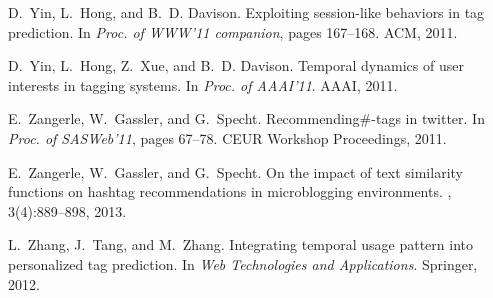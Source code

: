 \documentclass{sig-alternate-05-2015}
\begin{document}
\begin{thebibliography}{10}
D.~Yin, L.~Hong, and B.~D. Davison.
\newblock Exploiting session-like behaviors in tag prediction.
\newblock In {\em Proc. of WWW'11 companion}, pages 167--168. ACM, 2011.

D.~Yin, L.~Hong, Z.~Xue, and B.~D. Davison.
\newblock Temporal dynamics of user interests in tagging systems.
\newblock In {\em Proc. of AAAI'11}. AAAI, 2011.

E.~Zangerle, W.~Gassler, and G.~Specht.
\newblock Recommending\#-tags in twitter.
\newblock In {\em Proc. of SASWeb'11}, pages 67--78. CEUR Workshop Proceedings,
  2011.

E.~Zangerle, W.~Gassler, and G.~Specht.
\newblock On the impact of text similarity functions on hashtag recommendations
  in microblogging environments.
, 3(4):889--898, 2013.

L.~Zhang, J.~Tang, and M.~Zhang.
\newblock Integrating temporal usage pattern into personalized tag prediction.
\newblock In {\em Web Technologies and Applications}. Springer, 2012.

\end{thebibliography}
\end{document}

